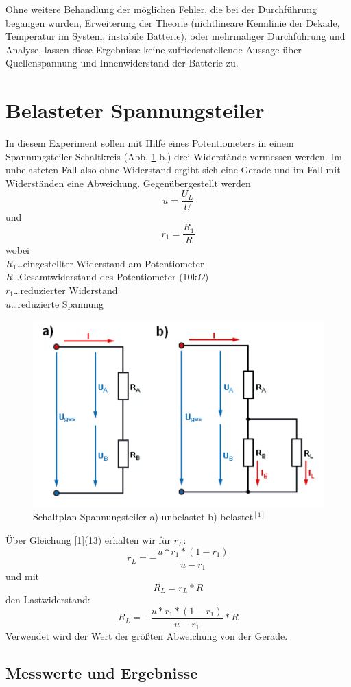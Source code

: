\documentclass[12pt,a4paper]{article}
\begin{document}
\begin{multicols}{2}
Ohne weitere Behandlung der möglichen Fehler, die bei der Durchführung begangen wurden, Erweiterung der Theorie (nichtlineare Kennlinie der Dekade, Temperatur im System, instabile Batterie), oder mehrmaliger Durchführung und Analyse, lassen diese Ergebnisse keine zufriedenstellende Aussage über Quellenspannung und Innenwiderstand der Batterie zu.


\section{Belasteter Spannungsteiler}
In diesem Experiment sollen mit Hilfe eines Potentiometers in einem Spannungsteiler-Schaltkreis (Abb. \ref{fig:schaltbild_spannungsteiler} b.) drei Widerstände vermessen werden. Im unbelasteten Fall also ohne Widerstand ergibt sich eine Gerade und im Fall mit Widerständen eine Abweichung. Gegenübergestellt werden
$$u = \frac{U_L}{U}$$
und
$$r_1 = \frac{R_1}{R}$$
wobei\\
$R_1$\ldots eingestellter Widerstand am Potentiometer  \\
$R$\ldots Gesamtwiderstand des Potentiometer (10k$\Omega$)\\
$r_1$\ldots reduzierter Widerstand \\
$u$\ldots reduzierte Spannung
\begin{figure}[H]
	\centering
	\includegraphics[scale=0.3]{./figure/spannungsteiler_schaltplan.png}
	\caption{Schaltplan Spannungsteiler a) unbelastet b) belastet$^{[1]}$}
	\label{fig:schaltbild_spannungsteiler}
\end{figure}
\noindent
Über Gleichung [1](13) erhalten wir für $r_L$:
$$r_L = - \frac{u*r_1 * (1-r_1)}{u-r_1}$$
und mit 
$$R_L = r_L * R$$
den Lastwiderstand:\\
$$R_L = - \frac{u*r_1 * (1-r_1)}{u-r_1} * R$$
Verwendet wird der Wert der größten Abweichung von der Gerade.
\subsection{Messwerte und Ergebnisse}
\end{multicols}
\end{document}
